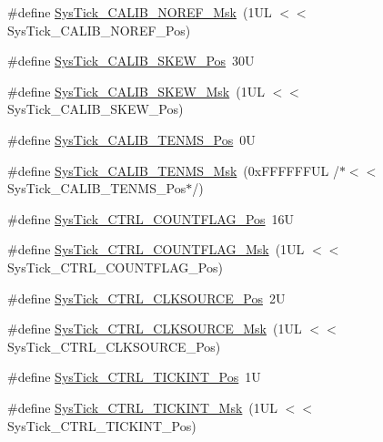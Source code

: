 \begin{DoxyCompactItemize}
\#define \mbox{\hyperlink{group___c_m_s_i_s___sys_tick_ga3af0d891fdd99bcc8d8912d37830edb6}{Sys\+Tick\+\_\+\+C\+A\+L\+I\+B\+\_\+\+N\+O\+R\+E\+F\+\_\+\+Msk}}~(1\+U\+L $<$$<$ Sys\+Tick\+\_\+\+C\+A\+L\+I\+B\+\_\+\+N\+O\+R\+E\+F\+\_\+\+Pos)
\item 
\#define \mbox{\hyperlink{group___c_m_s_i_s___sys_tick_gadd0c9cd6641b9f6a0c618e7982954860}{Sys\+Tick\+\_\+\+C\+A\+L\+I\+B\+\_\+\+S\+K\+E\+W\+\_\+\+Pos}}~30U
\item 
\#define \mbox{\hyperlink{group___c_m_s_i_s___sys_tick_ga8a6a85a87334776f33d77fd147587431}{Sys\+Tick\+\_\+\+C\+A\+L\+I\+B\+\_\+\+S\+K\+E\+W\+\_\+\+Msk}}~(1\+U\+L $<$$<$ Sys\+Tick\+\_\+\+C\+A\+L\+I\+B\+\_\+\+S\+K\+E\+W\+\_\+\+Pos)
\item 
\#define \mbox{\hyperlink{group___c_m_s_i_s___sys_tick_gacae558f6e75a0bed5d826f606d8e695e}{Sys\+Tick\+\_\+\+C\+A\+L\+I\+B\+\_\+\+T\+E\+N\+M\+S\+\_\+\+Pos}}~0U
\item 
\#define \mbox{\hyperlink{group___c_m_s_i_s___sys_tick_gaf1e68865c5aece2ad58971225bd3e95e}{Sys\+Tick\+\_\+\+C\+A\+L\+I\+B\+\_\+\+T\+E\+N\+M\+S\+\_\+\+Msk}}~(0x\+F\+F\+F\+F\+F\+F\+U\+L /$\ast$$<$$<$ Sys\+Tick\+\_\+\+C\+A\+L\+I\+B\+\_\+\+T\+E\+N\+M\+S\+\_\+\+Pos$\ast$/)
\item 
\#define \mbox{\hyperlink{group___c_m_s_i_s___sys_tick_gadbb65d4a815759649db41df216ed4d60}{Sys\+Tick\+\_\+\+C\+T\+R\+L\+\_\+\+C\+O\+U\+N\+T\+F\+L\+A\+G\+\_\+\+Pos}}~16U
\item 
\#define \mbox{\hyperlink{group___c_m_s_i_s___sys_tick_ga1bf3033ecccf200f59baefe15dbb367c}{Sys\+Tick\+\_\+\+C\+T\+R\+L\+\_\+\+C\+O\+U\+N\+T\+F\+L\+A\+G\+\_\+\+Msk}}~(1\+U\+L $<$$<$ Sys\+Tick\+\_\+\+C\+T\+R\+L\+\_\+\+C\+O\+U\+N\+T\+F\+L\+A\+G\+\_\+\+Pos)
\item 
\#define \mbox{\hyperlink{group___c_m_s_i_s___sys_tick_ga24fbc69a5f0b78d67fda2300257baff1}{Sys\+Tick\+\_\+\+C\+T\+R\+L\+\_\+\+C\+L\+K\+S\+O\+U\+R\+C\+E\+\_\+\+Pos}}~2U
\item 
\#define \mbox{\hyperlink{group___c_m_s_i_s___sys_tick_gaa41d06039797423a46596bd313d57373}{Sys\+Tick\+\_\+\+C\+T\+R\+L\+\_\+\+C\+L\+K\+S\+O\+U\+R\+C\+E\+\_\+\+Msk}}~(1\+U\+L $<$$<$ Sys\+Tick\+\_\+\+C\+T\+R\+L\+\_\+\+C\+L\+K\+S\+O\+U\+R\+C\+E\+\_\+\+Pos)
\item 
\#define \mbox{\hyperlink{group___c_m_s_i_s___sys_tick_ga88f45bbb89ce8df3cd2b2613c7b48214}{Sys\+Tick\+\_\+\+C\+T\+R\+L\+\_\+\+T\+I\+C\+K\+I\+N\+T\+\_\+\+Pos}}~1U
\item 
\#define \mbox{\hyperlink{group___c_m_s_i_s___sys_tick_ga95bb984266ca764024836a870238a027}{Sys\+Tick\+\_\+\+C\+T\+R\+L\+\_\+\+T\+I\+C\+K\+I\+N\+T\+\_\+\+Msk}}~(1\+U\+L $<$$<$ Sys\+Tick\+\_\+\+C\+T\+R\+L\+\_\+\+T\+I\+C\+K\+I\+N\+T\+\_\+\+Pos)
$$
\end{DoxyCompactItemize}
